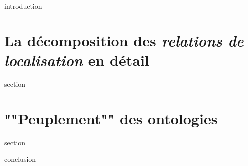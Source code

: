 \chaptertoc{}

\label{sec:5-int}
{introduction}

\section{La décomposition des \emph{relations de localisation} en
  détail}
\label{sec:5-1}
{section}

\section{""Peuplement"" des ontologies}
\label{sec:5-2}
{section}

\label{sec:5-cnc}
{conclusion}


